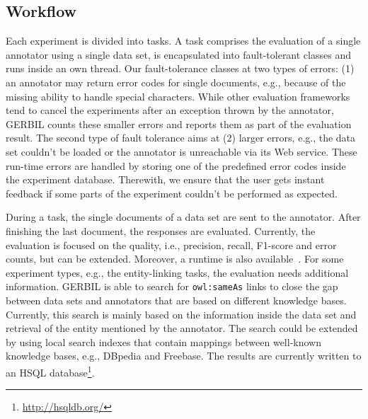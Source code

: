 \subsection{Workflow}
Each experiment is divided into tasks.
A task comprises the evaluation of a single annotator using a single data set, is encapsulated into fault-tolerant classes and runs inside an own thread.
Our fault-tolerance classes at two types of errors: (1) an annotator may return error codes for single documents, e.g., because of the missing ability to handle special characters.
While other evaluation frameworks tend to cancel the experiments after an exception thrown by the annotator, GERBIL counts these smaller errors and reports them as part of the evaluation result.
The second type of fault tolerance aims at (2) larger errors, e.g., the data set couldn't be loaded or the annotator is unreachable via its Web service.
These run-time errors are handled by storing one of the predefined error codes inside the experiment database.
Therewith, we ensure that the user gets instant feedback if some parts of the experiment couldn't be performed as expected.

During a task, the single documents of a data set are sent to the annotator.
After finishing the last document, the responses are evaluated.
Currently, the evaluation is focused on the quality, i.e., precision, recall, F1-score and error counts, but can be extended.
Moreover, a runtime is also available~\cite{GERBIL}.
For some experiment types, e.g., the entity-linking tasks, the evaluation needs additional information.
GERBIL is able to search for \texttt{owl:sameAs} links to close the gap between data sets and annotators that are based on different knowledge bases.
Currently, this search is mainly based on the information inside the data set and retrieval of the entity mentioned by the annotator.
The search could be extended by using local search indexes that contain mappings between well-known knowledge bases, e.g., DBpedia and Freebase.
The results are currently written to an HSQL database\footnote{\url{http://hsqldb.org/}}.


